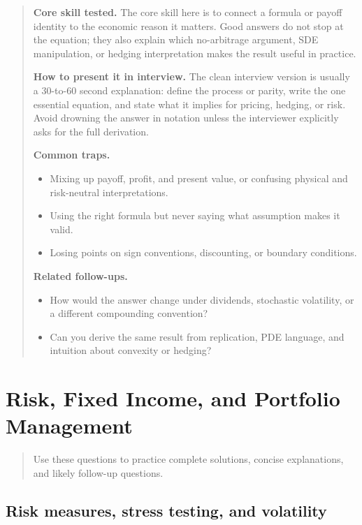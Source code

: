 \documentclass[11pt,letterpaper,openany]{book}
\newcommand{\ChapterIntro}[1]{%
  \begin{quote}\small #1\end{quote}%
}
\newenvironment{EditorialNote}
  {\begin{quote}\small\setlength{\parskip}{0.25em}}
  {\end{quote}}
\newcommand{\QuestionSpacer}{\vspace{0.4em}}
\begin{document}
\begin{EditorialNote}


\textbf{Core skill tested.} The core skill here is to connect a formula or payoff identity to the economic reason it matters. Good answers do not stop at the equation; they also explain which no-arbitrage argument, SDE manipulation, or hedging interpretation makes the result useful in practice.

\textbf{How to present it in interview.} The clean interview version is usually a 30-to-60 second explanation: define the process or parity, write the one essential equation, and state what it implies for pricing, hedging, or risk. Avoid drowning the answer in notation unless the interviewer explicitly asks for the full derivation.

\textbf{Common traps.}
\begin{itemize}
\item Mixing up payoff, profit, and present value, or confusing physical and risk-neutral interpretations.
\item Using the right formula but never saying what assumption makes it valid.
\item Losing points on sign conventions, discounting, or boundary conditions.
\end{itemize}

\textbf{Related follow-ups.}
\begin{itemize}
\item How would the answer change under dividends, stochastic volatility, or a different compounding convention?
\item Can you derive the same result from replication, PDE language, and intuition about convexity or hedging?
\end{itemize}


\end{EditorialNote}
\QuestionSpacer

\section{Risk, Fixed Income, and Portfolio Management}
\ChapterIntro{Use these questions to practice complete solutions, concise explanations, and likely follow-up questions.}

\subsection{Risk measures, stress testing, and volatility}
\end{document}

